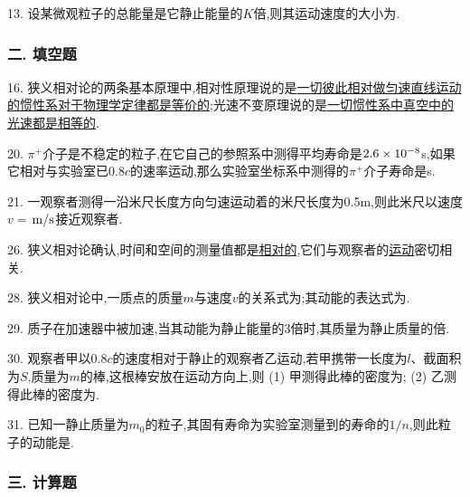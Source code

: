 13. 设某微观粒子的总能量是它静止能量的$K$倍,则其运动速度的大小为.

\subsubsection*{二. 填空题}

16. 狭义相对论的两条基本原理中,相对性原理说的是\ul{一切彼此相对做匀速直线运动的惯性系对于物理学定律都是等价的};光速不变原理说的是\ul{一切惯性系中真空中的光速都是相等的}.

20. $\pi^+$介子是不稳定的粒子,在它自己的参照系中测得平均寿命是$2.6\times10^{-8}$s,如果它相对与实验室已$0.8c$的速率运动,那么实验室坐标系中测得的$\pi^+$介子寿命是s.

21. 一观察者测得一沿米尺长度方向匀速运动着的米尺长度为0.5m,则此米尺以速度$v=$${\rm{\,{m/s}}}$接近观察者.

26. 狭义相对论确认,时间和空间的测量值都是\ul{相对的},它们与观察者的\ul{运动}密切相关.

28. 狭义相对论中,一质点的质量$m$与速度$v$的关系式为;其动能的表达式为.

29. 质子在加速器中被加速,当其动能为静止能量的3倍时,其质量为静止质量的倍.

30. 观察者甲以$0.8c$的速度相对于静止的观察者乙运动,若甲携带一长度为$l$、截面积为$S$,质量为$m$的棒,这根棒安放在运动方向上,则
    (1) 甲测得此棒的密度为;
    (2) 乙测得此棒的密度为.

31. 已知一静止质量为$m_0$的粒子,其固有寿命为实验室测量到的寿命的$1/n$,则此粒子的动能是.

\subsubsection*{三. 计算题}

